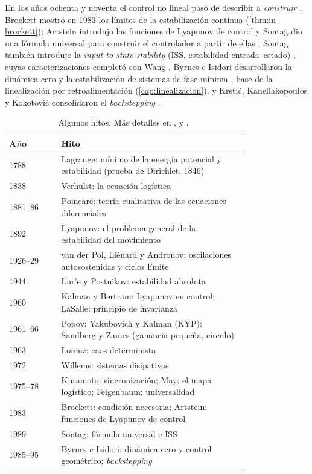 En los años ochenta y noventa el control no lineal pasó de describir a \emph{construir} \citep{KoAr01}. Brockett mostró en 1983 los límites de la estabilización continua (\cref{thm:in-brockett}); Artstein introdujo las funciones de Lyapunov de control \citep{Ars83} y Sontag dio una fórmula universal para construir el controlador a partir de ellas \citep{Son89}; Sontag también introdujo la \emph{input-to-state stability} (ISS, estabilidad entrada--estado) \citep{Son89a}, cuyas caracterizaciones completó con Wang \citep{SoWa95}. Byrnes e Isidori desarrollaron la dinámica cero y la estabilización de sistemas de fase mínima \citep{ByIs91,Isi95}, base de la linealización por retroalimentación (\cref{cap:linealizacion}), y Krstić, Kanellakopoulos y Kokotović consolidaron el \emph{backstepping} \citep{KKK95}.

\begin{table}[ht]
\centering\small
\begin{tabular}{@{}lp{0.78\linewidth}@{}}
\toprule
Año & Hito\\
\midrule
1788 & Lagrange: mínimo de la energía potencial y estabilidad (prueba de Dirichlet, 1846)\\
1838 & Verhulst: la ecuación logística\\
1881--86 & Poincaré: teoría cualitativa de las ecuaciones diferenciales\\
1892 & Lyapunov: el problema general de la estabilidad del movimiento\\
1926--29 & van der Pol, Liénard y Andronov: oscilaciones autosostenidas y ciclos límite\\
1944 & Lur'e y Postnikov: estabilidad absoluta\\
1960 & Kalman y Bertram: Lyapunov en control; LaSalle: principio de invarianza\\
1961--66 & Popov; Yakubovich y Kalman (KYP); Sandberg y Zames (ganancia pequeña, círculo)\\
1963 & Lorenz: caos determinista\\
1972 & Willems: sistemas disipativos\\
1975--78 & Kuramoto: sincronización; May: el mapa logístico; Feigenbaum: universalidad\\
1983 & Brockett: condición necesaria; Artstein: funciones de Lyapunov de control\\
1989 & Sontag: fórmula universal e ISS\\
1985--95 & Byrnes e Isidori: dinámica cero y control geométrico; \emph{backstepping}\\
\bottomrule
\end{tabular}
\caption{Algunos hitos. Más detalles en \citet{Ath96}, \citet{Mic96} y \citet{KoAr01}.}
\label{tab:in-historia}
\end{table}
